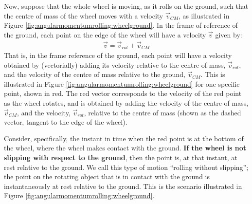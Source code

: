 Now, suppose that the whole wheel is moving, as it rolls on the ground, such that the centre of mass of the wheel moves with a velocity $\vec v_{CM}$, as illustrated in Figure \ref{fig:angularmomentumrolling:wheelground}.
In the frame of reference of the ground, each point on the edge of the wheel will have a velocity $\vec v$ given by:
\begin{align*}
\vec v = \vec v_{rot} + \vec v_{CM}
\end{align*}
That is, in the frame reference of the ground, each point will have a velocity obtained by (vectorially) adding its velocity relative to the centre of mass, $\vec v_{rot}$, and the velocity of the centre of mass relative to the ground, $\vec v_{CM}$. This is illustrated in Figure \ref{fig:angularmomentumrolling:wheelground} for one specific point, shown in red. The red vector corresponds to the velocity of the red point as the wheel rotates, and is obtained by adding the velocity of the centre of mass, $\vec v_{CM}$, and the velocity, $\vec v_{rot}$, relative to the centre of mass (shown as the dashed vector, tangent to the edge of the wheel). 

Consider, specifically, the instant in time when the red point is at the bottom of the wheel, where the wheel makes contact with the ground. \textbf{If the wheel is not slipping with respect to the ground}, then the point is, at that instant, at rest relative to the ground. We call this type of motion ``rolling without slipping''; the point on the rotating object that is in contact with the ground is instantaneously at rest relative to the ground. This is the scenario illustrated in Figure \ref{fig:angularmomentumrolling:wheelground}.

